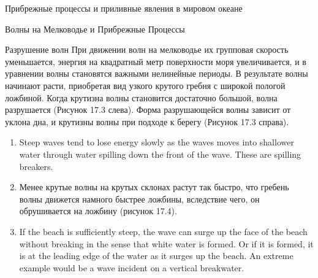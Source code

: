 \begin{chapter}{Прибрежные процессы и приливные явления в мировом океане}
\begin{section}{Волны на Мелководье и Прибрежные Процессы}
\begin{paragraph}{Разрушение волн}
При движении волн на мелководье их групповая скорость уменьшается,
энергия на квадратный метр поверхности моря увеличивается, и в
уравнении волны становятся важными нелинейные периоды. В результате
волны начинают расти, приобретая вид узкого крутого гребня с широкой
пологой ложбиной. Когда крутизна волны становится достаточно большой,
волна разрушается (Рисунок 17.3 слева). Форма разрушающейся волны
зависит от уклона дна, и крутизны волны при подходе к берегу (Рисунок
17.3 справа).
%
%
\begin{enumerate}
\item 
Steep waves tend to lose energy slowly as the waves moves into
shallower water through water spilling down the front of the
wave. These are spilling breakers.
%

\item
Менее крутые волны на крутых склонах растут так быстро, что гребень
волны движется намного быстрее ложбины, вследствие чего, он
обрушивается на ложбину (рисунок 17.4).
%

\item
If the beach is sufficiently steep, the wave can
surge up the face of the beach without
breaking in the sense that white water is formed. Or if it is formed,
it is at the leading edge of the water as it surges up the beach. An
extreme example would be a wave incident on a vertical breakwater.
%
\end{enumerate}
\end{paragraph}


\end{section}
\end{chapter}
